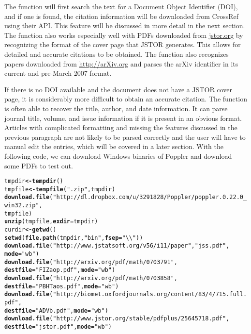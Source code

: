 \documentclass[article]{jss}\usepackage[]{graphicx}\usepackage[]{color}
\makeatletter
\newcommand{\hlstr}[1]{\textcolor[rgb]{0.125,0.125,1}{#1}}%
\newcommand{\hlstd}[1]{\textcolor[rgb]{0.251,0.251,0.282}{#1}}%
\newcommand{\hlkwb}[1]{\textcolor[rgb]{0.439,0.251,1}{\textbf{#1}}}%
\newcommand{\hlkwc}[1]{\textcolor[rgb]{0.529,0,0.184}{\textbf{#1}}}%
\newcommand{\hlkwd}[1]{\textcolor[rgb]{0.251,0.251,0.282}{\textbf{#1}}}%
\newenvironment{kframe}{%
 \def\at@end@of@kframe{}%
 \ifinner\ifhmode%
  \def\at@end@of@kframe{\end{minipage}}%
  \begin{minipage}{\columnwidth}%
 \fi\fi%
 \def\FrameCommand##1{\hskip\@totalleftmargin \hskip-\fboxsep
 \colorbox{shadecolor}{##1}\hskip-\fboxsep
     \hskip-\linewidth \hskip-\@totalleftmargin \hskip\columnwidth}%
 \MakeFramed {\advance\hsize-\width
   \@totalleftmargin\z@ \linewidth\hsize
   \@setminipage}}%
 {\par\unskip\endMakeFramed%
 \at@end@of@kframe}
\newenvironment{knitrout}{}{} %
\makeatother
\begin{document}
The function will first search the text for a Document Object Identifier (DOI), and if one is found, the citation information will be downloaded from CrossRef using their API.  This feature will be discussed in more detail in the next section.  The function also works especially well with PDFs downloaded from \url{jstor.org} by recognizing the format of the cover page that JSTOR generates.  This allows for detailed and accurate citations to be obtained.  The function also recognizes papers downloaded from \url{http://arXiv.org} and parses the arXiv identifier in its current and pre-March 2007 format.

If there is no DOI available and the document does not have a JSTOR cover page, it is considerably more difficult to obtain an accurate citation.  The function is often able to recover the title, author, and date information.  It can parse journal title, volume, and issue information if it is present in an obvious format.  Articles with complicated formatting and missing the features discussed in the previous paragraph are not likely to be parsed correctly and the user will have to manual edit the entries, which will be covered in a later section.
With the following code, we can download Windows binaries of Poppler and download some PDFs
to test out.
\begin{knitrout}
\color{fgcolor}\begin{kframe}
\begin{alltt}
\hlstd{tmpdir} \hlkwb{<-} \hlkwd{tempdir}\hlstd{()}
\hlstd{tmpfile} \hlkwb{<-} \hlkwd{tempfile}\hlstd{(}\hlstr{".zip"}\hlstd{, tmpdir)}
\hlkwd{download.file}\hlstd{(}\hlstr{"http://dl.dropbox.com/u/3291828/Poppler/poppler.0.22.0_win32.zip"}\hlstd{,}
              \hlstd{tmpfile)}
\hlkwd{unzip}\hlstd{(tmpfile,} \hlkwc{exdir} \hlstd{= tmpdir)}
\hlstd{curdir} \hlkwb{<-} \hlkwd{getwd}\hlstd{()}
\hlkwd{setwd}\hlstd{(}\hlkwd{file.path}\hlstd{(tmpdir,} \hlstr{"bin"}\hlstd{,} \hlkwc{fsep} \hlstd{=} \hlstr{"\textbackslash{}\textbackslash{}"}\hlstd{))}
\hlkwd{download.file}\hlstd{(}\hlstr{"http://www.jstatsoft.org/v56/i11/paper"}\hlstd{,} \hlstr{"jss.pdf"}\hlstd{,}
                \hlkwc{mode} \hlstd{=} \hlstr{"wb"}\hlstd{)}
\hlkwd{download.file}\hlstd{(}\hlstr{"http://arxiv.org/pdf/math/0703791"}\hlstd{,}
              \hlkwc{destfile} \hlstd{=} \hlstr{"FIZaop.pdf"}\hlstd{,} \hlkwc{mode} \hlstd{=} \hlstr{"wb"}\hlstd{)}
\hlkwd{download.file}\hlstd{(}\hlstr{"http://arxiv.org/pdf/math/0703858"}\hlstd{,}
              \hlkwc{destfile} \hlstd{=} \hlstr{"PBHTaos.pdf"}\hlstd{,} \hlkwc{mode} \hlstd{=} \hlstr{"wb"}\hlstd{)}
\hlkwd{download.file}\hlstd{(}\hlstr{"http://biomet.oxfordjournals.org/content/83/4/715.full.pdf"}\hlstd{,}
  \hlkwc{destfile} \hlstd{=} \hlstr{"ADVb.pdf"}\hlstd{,} \hlkwc{mode} \hlstd{=} \hlstr{"wb"}\hlstd{)}
\hlkwd{download.file}\hlstd{(}\hlstr{"http://www.jstor.org/stable/pdfplus/25645718.pdf"}\hlstd{,}
              \hlkwc{destfile} \hlstd{=} \hlstr{"jstor.pdf"}\hlstd{,} \hlkwc{mode} \hlstd{=} \hlstr{"wb"}\hlstd{)}
\end{alltt}
\end{kframe}
\end{knitrout}
\end{document}
